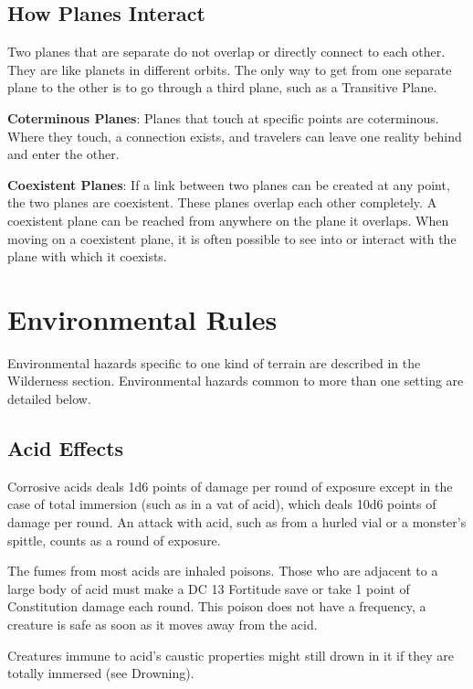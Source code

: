 \subsection{How Planes Interact}

				
Two planes that are separate do not overlap or directly connect to each other. They are like planets in different orbits. The only way to get from one separate plane to the other is to go through a third plane, such as a Transitive Plane.
				
\textbf{Coterminous Planes}: Planes that touch at specific points are coterminous. Where they touch, a connection exists, and travelers can leave one reality behind and enter the other.
				
\textbf{Coexistent Planes}: If a link between two planes can be created at any point, the two planes are coexistent. These planes overlap each other completely. A coexistent plane can be reached from anywhere on the plane it overlaps. When moving on a coexistent plane, it is often possible to see into or interact with the plane with which it coexists. 
				
\section{Environmental Rules}

				
Environmental hazards specific to one kind of terrain are described in the Wilderness section. Environmental hazards common to more than one setting are detailed below.
				
\subsection{Acid Effects}

				
Corrosive acids deals 1d6 points of damage per round of exposure except in the case of total immersion (such as in a vat of acid), which deals 10d6 points of damage per round. An attack with acid, such as from a hurled vial or a monster's spittle, counts as a round of exposure.
				
The fumes from most acids are inhaled poisons. Those who are adjacent to a large body of acid must make a DC 13 Fortitude save or take 1 point of Constitution damage each round. This poison does not have a frequency, a creature is safe as soon as it moves away from the acid.
				
Creatures immune to acid's caustic properties might still drown in it if they are totally immersed (see Drowning).
				
